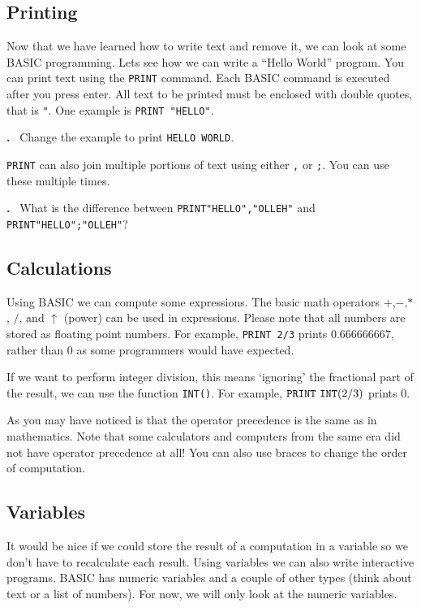 \documentclass{article}
\newcounter{problem}
\newcounter{solution}
\newcommand\problem{%
  \stepcounter{problem}%
  \textbf{\theproblem.}~%
  \setcounter{solution}{0}%
}
\begin{document}
\subsection{Printing}

Now that we have learned how to write text and remove it, we can look at some BASIC programming.
Lets see how we can write a ``Hello World'' program.
You can print text using the \verb:PRINT: command.
Each BASIC command is executed after you press enter.
All text to be printed must be enclosed with double quotes, that is \verb:":.
One example is \verb:PRINT "HELLO":.

\problem Change the example to print \verb:HELLO WORLD:.

\verb:PRINT: can also join multiple portions of text using either \verb:,: or \verb:;:.
You can use these multiple times.

\problem What is the difference between \verb:PRINT"HELLO","OLLEH": and \verb:PRINT"HELLO";"OLLEH":?

\subsection{Calculations}

Using BASIC we can compute some expressions.
The basic math operators $+$,$-$,$*$, $/$, and $\uparrow$ (power) can be used in expressions.
Please note that all numbers are stored as floating point numbers.
For example, \verb:PRINT 2/3: prints $0.666666667$, rather than $0$ as some programmers would have expected.

If we want to perform integer division, this means `ignoring' the fractional part of the result,
we can use the function \verb:INT():.
For example, $\verb:PRINT:\ \verb:INT:(2/3)$ prints $0$.

As you may have noticed is that the operator precedence is the same as in mathematics.
Note that some calculators and computers from the same era did not have operator precedence at all!
You can also use braces to change the order of computation.

\subsection{Variables}

It would be nice if we could store the result of a computation in a variable so we don't have to recalculate each result.
Using variables we can also write interactive programs.
BASIC has numeric variables and a couple of other types (think about text or a list of numbers).
For now, we will only look at the numeric variables.
\end{document}
